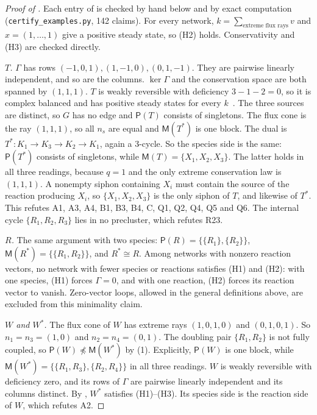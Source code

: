 \documentclass[11pt,a4paper]{report}
\newcommand{\Pre}{\mathsf{P}}
\newcommand{\Mips}{\mathsf{M}}
\newcommand{\nrefi}{\not\preceq}
\begin{document}
\begin{proof}[Proof of ]
Each entry of  is checked by hand below and by exact computation
(\texttt{certify\_examples.py}, 142 claims). For every network, \(k=\sum_{\text{extreme flux rays}}v\) and
\(x=(1,\dots,1)\) give a positive steady state, so (H2) holds. Conservativity and (H3) are checked directly.

\emph{\(T\).} \(\Gamma\) has rows \((-1,0,1),(1,-1,0),(0,1,-1)\). They are pairwise linearly independent, and so are
the columns. \(\ker\Gamma\) and the conservation space are both spanned by \((1,1,1)\). \(T\) is weakly reversible
with deficiency \(3-1-2=0\), so it is complex balanced and has positive steady states for every
\(k\)~\autocite{HornJackson1972,Feinberg2019}. The three sources are distinct, so \(G\) has no edge and \(\Pre(T)\)
consists of singletons. The flux cone is the ray \((1,1,1)\), so all \(n_s\) are equal and \(\Mips(T^*)\) is one
block. The dual is \(T^*\colon K_1\to K_3\to K_2\to K_1\), again a 3-cycle. So the species side is the same:
\(\Pre(T^*)\) consists of singletons, while \(\Mips(T)=\{X_1,X_2,X_3\}\). The latter holds in all three readings,
because \(q=1\) and the only extreme conservation law is \((1,1,1)\). A nonempty siphon containing \(X_i\) must
contain the source of the reaction producing \(X_i\), so \(\{X_1,X_2,X_3\}\) is the only siphon of \(T\), and likewise
of \(T^*\). This refutes A1, A3, A4, B1, B3, B4, C, Q1, Q2, Q4, Q5 and Q6. The internal cycle \(\{R_1,R_2,R_3\}\)
lies in no precluster, which refutes R23.

\emph{\(R\).} The same argument with two species: \(\Pre(R)=\{\{R_1\},\{R_2\}\}\), \(\Mips(R^*)=\{\{R_1,R_2\}\}\),
and \(R^*\cong R\). Among networks with nonzero reaction vectors, no network with fewer species or reactions
satisfies (H1) and (H2): with one species, (H1) forces \(\Gamma=0\), and with one reaction, (H2) forces its reaction
vector to vanish. Zero-vector loops, allowed in the general definitions above, are excluded from this minimality claim.

\emph{\(W\) and \(W^*\).} The flux cone of \(W\) has extreme rays \((1,0,1,0)\) and \((0,1,0,1)\). So
\(n_1=n_3=(1,0)\) and \(n_2=n_4=(0,1)\). The doubling pair \(\{R_1,R_2\}\) is not fully coupled, so
\(\Pre(W)\nrefi\Mips(W^*)\) by (1). Explicitly, \(\Pre(W)\) is one block, while
\(\Mips(W^*)=\{\{R_1,R_3\},\{R_2,R_4\}\}\) in all three readings. \(W\) is weakly reversible with deficiency zero, and
its rows of \(\Gamma\) are pairwise linearly independent and its columns distinct. By , \(W^*\) satisfies
(H1)--(H3). Its species side is the reaction side of \(W\), which refutes A2.


\end{proof}
\end{document}
